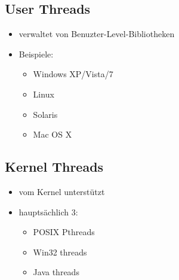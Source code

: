 \documentclass[a4paper]{scrreprt}
\begin{document}
\subsection{User Threads}
\begin{itemize}
\item verwaltet von Benuzter-Level-Bibliotheken
\item Beispiele:
\begin{itemize}
\item Windows XP/Vista/7
\item Linux
\item Solaris
\item Mac OS X
\end{itemize}
\end{itemize}
\subsection{Kernel Threads}
\begin{itemize}
\item vom Kernel unterstützt
\item hauptsächlich 3:
\begin{itemize}
\item POSIX Pthreads
\item Win32 threads
\item Java threads
\end{itemize}
\end{itemize}
\end{document}
